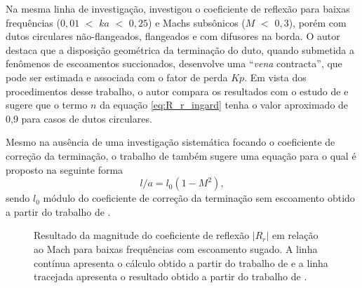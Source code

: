 Na mesma linha de investigação,  investigou o coeficiente de reflexão para baixas frequências ($0,01$ $<$ $ka$ $<$ $0,25$) e Machs subsônicos ($M$ $<$ $0,3$), porém com dutos circulares não-flangeados, flangeados e com difusores na borda. O autor destaca que a disposição geométrica da terminação do duto, quando submetida a fenômenos de escoamentos succionados, desenvolve uma ``\textit{vena} contracta'', que pode ser estimada e associada com o fator de perda $Kp$. Em vista dos procedimentos desse trabalho, o autor compara os resultados com o estudo de  e sugere que o termo $n$ da equação \ref{eq:R_r_ingard} tenha o valor aproximado de 0,9 para casos de dutos circulares. 

Mesmo na ausência de uma investigação sistemática focando o coeficiente de correção da terminação, o trabalho de  também sugere uma equação para o qual é proposto na seguinte forma
\begin{equation}
    l/a = l_{0}(1 - M^{2}),
    \label{eq:l_M}
\end{equation} 
sendo $l_{0}$ módulo do coeficiente de correção da terminação sem escoamento obtido a partir do trabalho de .


\begin{figure}[h!]
\centering
  \caption[Coeficiente de reflexão $|R_{r}|$ com escoamento sugado]{Resultado da magnitude do coeficiente de reflexão $|R_{r}|$ em relação ao Mach para baixas frequências com escoamento sugado. A linha contínua apresenta o cálculo obtido a partir do trabalho de  e a linha tracejada apresenta o resultado obtido a partir do trabalho de .}
  \label{fig:comp3}
\end{figure}

